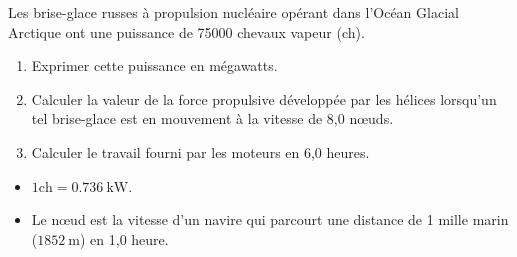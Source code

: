 Les brise-glace russes à propulsion nucléaire opérant dans l'Océan Glacial
Arctique ont une puissance de 75000 chevaux vapeur (ch).
\begin{enumerate}
    \item Exprimer cette puissance en mégawatts.
    \item Calculer la valeur de la force propulsive développée par les hélices
          lorsqu'un tel brise-glace est en mouvement à la vitesse de 8,0 nœuds.
    \item Calculer le travail fourni par les moteurs en 6,0 heures.
\end{enumerate}

\begin{donnees}
    \begin{itemize}
        \item $1 \mathrm{ch}=\qty{0.736}{\kW}$.
        \item Le nœud est la vitesse d'un navire qui parcourt une distance de 1
              mille marin ($\qty{1852}{\m}$) en 1,0 heure.
    \end{itemize}
\end{donnees}

